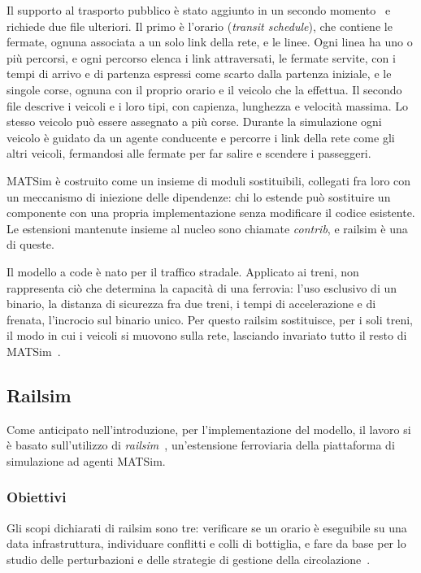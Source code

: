 Il supporto al trasporto pubblico è stato aggiunto in un secondo momento~\cite{rieser2010adding} e richiede due file ulteriori. Il primo è l'orario (\textit{transit schedule}), che contiene le fermate, ognuna associata a un solo link della rete, e le linee. Ogni linea ha uno o più percorsi, e ogni percorso elenca i link attraversati, le fermate servite, con i tempi di arrivo e di partenza espressi come scarto dalla partenza iniziale, e le singole corse, ognuna con il proprio orario e il veicolo che la effettua. Il secondo file descrive i veicoli e i loro tipi, con capienza, lunghezza e velocità massima. Lo stesso veicolo può essere assegnato a più corse. Durante la simulazione ogni veicolo è guidato da un agente conducente e percorre i link della rete come gli altri veicoli, fermandosi alle fermate per far salire e scendere i passeggeri.

MATSim è costruito come un insieme di moduli sostituibili, collegati fra loro con un meccanismo di iniezione delle dipendenze: chi lo estende può sostituire un componente con una propria implementazione senza modificare il codice esistente. Le estensioni mantenute insieme al nucleo sono chiamate \textit{contrib}, e railsim è una di queste.

Il modello a code è nato per il traffico stradale. Applicato ai treni, non rappresenta ciò che determina la capacità di una ferrovia: l'uso esclusivo di un binario, la distanza di sicurezza fra due treni, i tempi di accelerazione e di frenata, l'incrocio sul binario unico. Per questo railsim sostituisce, per i soli treni, il modo in cui i veicoli si muovono sulla rete, lasciando invariato tutto il resto di MATSim~\cite{kaddoura2024railsim}.

\subsection{Railsim}
Come anticipato nell'introduzione, per l'implementazione del modello, il lavoro si è basato sull'utilizzo di \textit{railsim}~\cite{kaddoura2024railsim}, un'estensione ferroviaria della piattaforma di simulazione ad agenti MATSim.\\

\subsubsection{Obiettivi}
Gli scopi dichiarati di railsim sono tre: verificare se un orario è eseguibile su una data infrastruttura, individuare conflitti e colli di bottiglia, e fare da base per lo studio delle perturbazioni e delle strategie di gestione della circolazione~\cite{kaddoura2024railsim}. 

